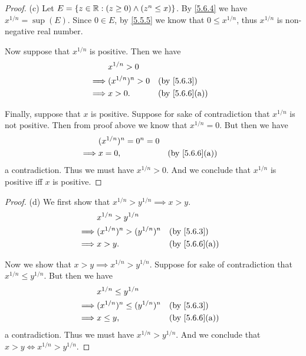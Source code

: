 \begin{proof}{(c)}
  Let \(E = \{z \in \mathbb{R} : (z \geq 0) \land (z^n \leq x)\}\).
  By \cref{5.6.4} we have \(x^{1 / n} = \sup(E)\).
  Since \(0 \in E\), by \cref{5.5.5} we know that \(0 \leq x^{1 / n}\), thus \(x^{1 / n}\) is non-negative real number.

  Now suppose that \(x^{1 / n}\) is positive.
  Then we have
  \begin{align*}
             & x^{1 / n} > 0                                      \\
    \implies & (x^{1 / n})^n > 0 &  & \by{5.6.3}                  \\
    \implies & x > 0.            &  & \text{(by \cref{5.6.6}(a))} \\
  \end{align*}

  Finally, suppose that \(x\) is positive.
  Suppose for sake of contradiction that \(x^{1 / n}\) is not positive.
  Then from proof above we know that \(x^{1 / n} = 0\).
  But then we have
  \begin{align*}
             & (x^{1 / n})^n = 0^n = 0                                  \\
    \implies & x = 0,                  &  & \text{(by \cref{5.6.6}(a))}
  \end{align*}
  a contradiction.
  Thus we must have \(x^{1 / n} > 0\).
  And we conclude that \(x^{1 / n}\) is positive iff \(x\) is positive.
\end{proof}

\begin{proof}{(d)}
  We first show that \(x^{1 / n} > y^{1 / n} \implies x > y\).
  \begin{align*}
             & x^{1 / n} > y^{1 / n}                                          \\
    \implies & (x^{1 / n})^n > (y^{1 / n})^n &  & \by{5.6.3}                  \\
    \implies & x > y.                        &  & \text{(by \cref{5.6.6}(a))}
  \end{align*}

  Now we show that \(x > y \implies x^{1 / n} > y^{1 / n}\).
  Suppose for sake of contradiction that \(x^{1 / n} \leq y^{1 / n}\).
  But then we have
  \begin{align*}
             & x^{1 / n} \leq y^{1 / n}                                          \\
    \implies & (x^{1 / n})^n \leq (y^{1 / n})^n &  & \by{5.6.3}                  \\
    \implies & x \leq y,                        &  & \text{(by \cref{5.6.6}(a))}
  \end{align*}
  a contradiction.
  Thus we must have \(x^{1 / n} > y^{1 / n}\).
  And we conclude that \(x > y \iff x^{1 / n} > y^{1 / n}\).
\end{proof}

